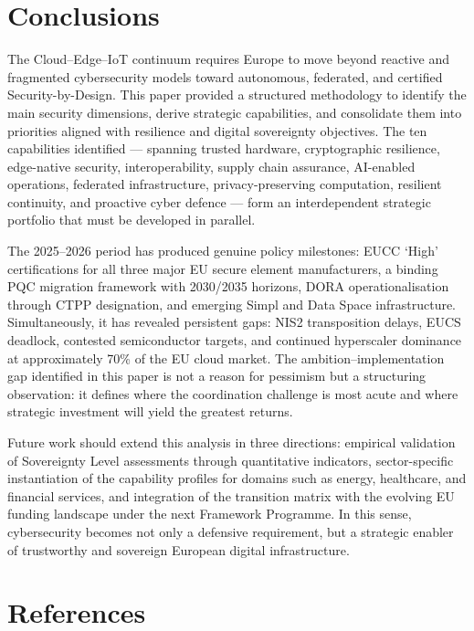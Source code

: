 \documentclass{ieeeaccess}
\begin{document}
\section{Conclusions}\label{conclusions}

The Cloud--Edge--IoT continuum requires Europe to move beyond reactive
and fragmented cybersecurity models toward autonomous, federated, and
certified Security-by-Design. This paper provided a structured
methodology to identify the main security dimensions, derive strategic
capabilities, and consolidate them into priorities aligned with
resilience and digital sovereignty objectives. The ten capabilities
identified --- spanning trusted hardware, cryptographic resilience,
edge-native security, interoperability, supply chain assurance,
AI-enabled operations, federated infrastructure, privacy-preserving
computation, resilient continuity, and proactive cyber defence --- form
an interdependent strategic portfolio that must be developed in
parallel.

The 2025--2026 period has produced genuine policy milestones: EUCC
`High' certifications for all three major EU secure element
manufacturers, a binding PQC migration framework with 2030/2035
horizons, DORA operationalisation through CTPP designation, and emerging
Simpl and Data Space infrastructure. Simultaneously, it has revealed
persistent gaps: NIS2 transposition delays, EUCS deadlock, contested
semiconductor targets, and continued hyperscaler dominance at
approximately 70\% of the EU cloud market. The ambition--implementation
gap identified in this paper is not a reason for pessimism but a
structuring observation: it defines where the coordination challenge is
most acute and where strategic investment will yield the greatest
returns.

Future work should extend this analysis in three directions: empirical
validation of Sovereignty Level assessments through quantitative
indicators, sector-specific instantiation of the capability profiles for
domains such as energy, healthcare, and financial services, and
integration of the transition matrix with the evolving EU funding
landscape under the next Framework Programme. In this sense,
cybersecurity becomes not only a defensive requirement, but a strategic
enabler of trustworthy and sovereign European digital infrastructure.

\section*{References}
\end{document}
